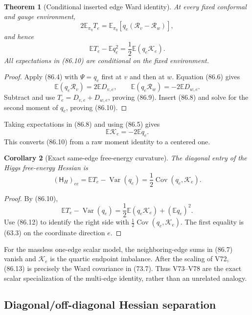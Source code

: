 \documentclass[11pt]{article}
\newtheorem{theorem}{Theorem}[section]
\newtheorem{corollary}[theorem]{Corollary}
\theoremstyle{remark}
\begin{document}
\begin{theorem}[Conditional inserted edge Ward identity]
\label{thm:v17v86-inserted}
At every fixed conformal and gauge environment,
\[
\boxed{
 2\mathbb E_{\pi_\eta}T_e
 =\mathbb E_{\pi_\eta}
 [q_e(\mathcal R_v-\mathcal R_w)],}               \tag{86.9}
\]
and hence
\[
\boxed{
 \mathbb ET_e-\mathbb Eq_e^2
 =\frac12\mathbb E(q_e\mathcal K_e).}             \tag{86.10}
\]
All expectations in (86.10) are conditional on the fixed environment.
\end{theorem}

\begin{proof}
Apply (86.4) with \(\Psi=q_e\) first at \(v\) and then at \(w\).
Equation (86.6) gives
\[
 \mathbb E(q_e\mathcal R_v)=2\mathbb ED_{v,e},
 \qquad
 \mathbb E(q_e\mathcal R_w)=-2\mathbb ED_{w,e}.  \tag{86.11}
\]
Subtract and use \(T_e=D_{v,e}+D_{w,e}\), proving (86.9).
Insert (86.8) and solve for the second moment of \(q_e\), proving
(86.10).
\end{proof}

Taking expectations in (86.8) and using (86.5) gives
\[
 \mathbb E\mathcal K_e=-2\mathbb Eq_e.           \tag{86.12}
\]
This converts (86.10) from a raw moment identity to a centered one.

\begin{corollary}[Exact same-edge free-energy curvature]
\label{cor:v17v86-diagonal}
The diagonal entry of the Higgs free-energy Hessian is
\[
\boxed{
 (\mathsf H_H)_{ee}
 =\mathbb ET_e-\operatorname{Var}(q_e)
 =\frac12\operatorname{Cov}(q_e,\mathcal K_e).}   \tag{86.13}
\]
\end{corollary}

\begin{proof}
By (86.10),
\[
 \mathbb ET_e-\operatorname{Var}(q_e)
 =\frac12\mathbb E(q_e\mathcal K_e)+(\mathbb Eq_e)^2.
\]
Use (86.12) to identify the right side with
\(\frac12\operatorname{Cov}(q_e,\mathcal K_e)\).
The first equality is (63.3) on the coordinate direction \(e\).
\end{proof}

For the massless one-edge scalar model, the neighboring-edge sums in
(86.7) vanish and \(\mathcal K_e\) is the quartic endpoint imbalance.
After the scaling of V72, (86.13) is precisely the Ward covariance in
(73.7).  Thus V73--V78 are the exact scalar specialization of the
multi-edge identity, rather than an unrelated analogy.

\subsection{Diagonal/off-diagonal Hessian separation}
\end{document}
